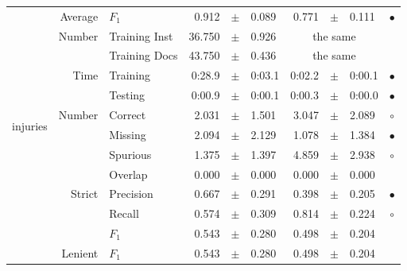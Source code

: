 \begin{longtable}{|r|r|l||rcl|rcl|c|}
\cline{2-10} &                     Average &           $F_1$ &       0.912 &  $\pm$  &       0.089 &       0.771 &  $\pm$  &       0.111 & $\bullet$ \\
\cline{2-10} & \multirow{2}{*}{    Number} &   Training Inst &      36.750 &  $\pm$  &       0.926 &    \multicolumn{3}{c|}{the same}         &  \\
\cline{3-10} &                             &   Training Docs &      43.750 &  $\pm$  &       0.436 &    \multicolumn{3}{c|}{the same}         &  \\
\cline{2-10} & \multirow{2}{*}{      Time} &        Training &      0:28.9 &  $\pm$  &      0:03.1 &      0:02.2 &  $\pm$  &      0:00.1 & $\bullet$ \\
\cline{3-10} &                             &         Testing &      0:00.9 &  $\pm$  &      0:00.1 &      0:00.3 &  $\pm$  &      0:00.0 & $\bullet$ \\
\hline
\hline
\multirow{11}{*}{\begin{sideways}injuries\end{sideways} }
             & \multirow{4}{*}{    Number} &         Correct &       2.031 &  $\pm$  &       1.501 &       3.047 &  $\pm$  &       2.089 & $\circ$ \\
\cline{3-10} &                             &         Missing &       2.094 &  $\pm$  &       2.129 &       1.078 &  $\pm$  &       1.384 & $\bullet$ \\
\cline{3-10} &                             &        Spurious &       1.375 &  $\pm$  &       1.397 &       4.859 &  $\pm$  &       2.938 & $\circ$ \\
\cline{3-10} &                             &         Overlap &       0.000 &  $\pm$  &       0.000 &       0.000 &  $\pm$  &       0.000 &  \\
\cline{2-10} & \multirow{3}{*}{    Strict} &       Precision &       0.667 &  $\pm$  &       0.291 &       0.398 &  $\pm$  &       0.205 & $\bullet$ \\
\cline{3-10} &                             &          Recall &       0.574 &  $\pm$  &       0.309 &       0.814 &  $\pm$  &       0.224 & $\circ$ \\
\cline{3-10} &                             &           $F_1$ &       0.543 &  $\pm$  &       0.280 &       0.498 &  $\pm$  &       0.204 &  \\
\cline{2-10} &                     Lenient &           $F_1$ &       0.543 &  $\pm$  &       0.280 &       0.498 &  $\pm$  &       0.204 &  \\

\end{longtable}
